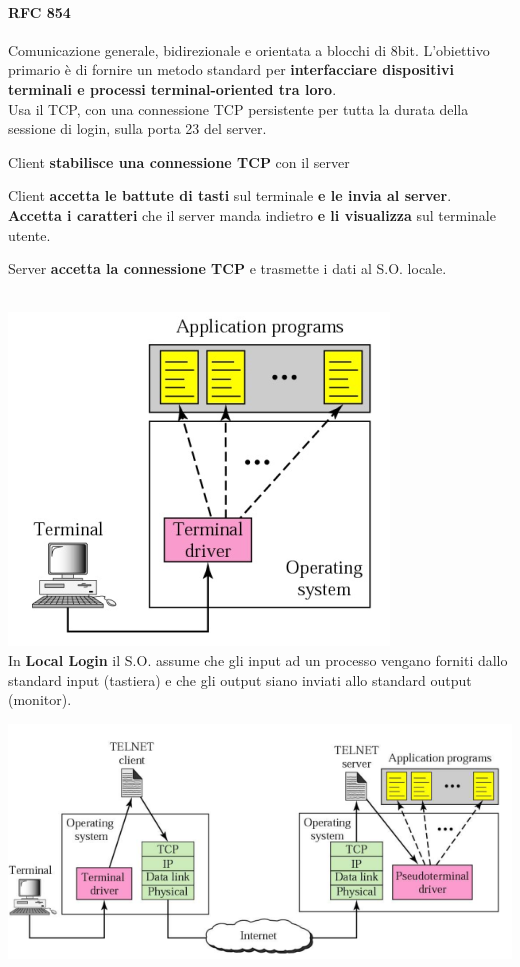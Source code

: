 \documentclass[10pt]{article}
\begin{document}
\paragraph{RFC 854} Comunicazione generale, bidirezionale e orientata a blocchi di 8bit. L'obiettivo primario è di fornire un metodo standard per \textbf{interfacciare dispositivi terminali e processi terminal-oriented tra loro}.\\
Usa il TCP, con una connessione TCP persistente per tutta la durata della sessione di login, sulla porta 23 del server.
\begin{list}{}{}
\item Client \textbf{stabilisce una connessione TCP} con il server
\item Client \textbf{accetta le battute di tasti} sul terminale \textbf{e le invia al server}.\\
\textbf{Accetta i caratteri} che il server manda indietro \textbf{e li visualizza} sul terminale utente.
\item Server \textbf{accetta la connessione TCP} e trasmette i dati al S.O. locale.\\\\
\end{list}
\begin{multicols}{2}
\includegraphics[scale=0.5]{locallogin.png}\\
In \textbf{Local Login} il S.O. assume che gli input ad un processo vengano forniti dallo standard input (tastiera) e che gli output siano inviati allo standard output (monitor).
\end{multicols}
\pagebreak
\includegraphics[scale=0.75]{remotelogin.png}\\
\end{document}

